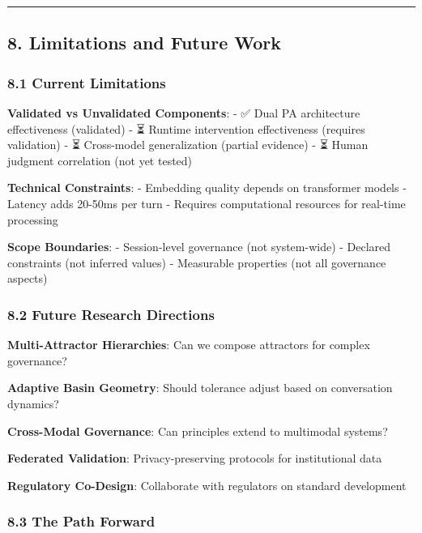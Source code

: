 \begin{center}\rule{0.5\linewidth}{0.5pt}\end{center}

\subsection{8. Limitations and Future
Work}\label{limitations-and-future-work}

\subsubsection{8.1 Current Limitations}\label{current-limitations}

\textbf{Validated vs Unvalidated Components}: - ✅ Dual PA architecture
effectiveness (validated) - ⏳ Runtime intervention effectiveness
(requires validation) - ⏳ Cross-model generalization (partial evidence)
- ⏳ Human judgment correlation (not yet tested)

\textbf{Technical Constraints}: - Embedding quality depends on
transformer models - Latency adds 20-50ms per turn - Requires
computational resources for real-time processing

\textbf{Scope Boundaries}: - Session-level governance (not system-wide)
- Declared constraints (not inferred values) - Measurable properties
(not all governance aspects)

\subsubsection{8.2 Future Research
Directions}\label{future-research-directions}

\textbf{Multi-Attractor Hierarchies}: Can we compose attractors for
complex governance?

\textbf{Adaptive Basin Geometry}: Should tolerance adjust based on
conversation dynamics?

\textbf{Cross-Modal Governance}: Can principles extend to multimodal
systems?

\textbf{Federated Validation}: Privacy-preserving protocols for
institutional data

\textbf{Regulatory Co-Design}: Collaborate with regulators on standard
development

\subsubsection{8.3 The Path Forward}\label{the-path-forward}

